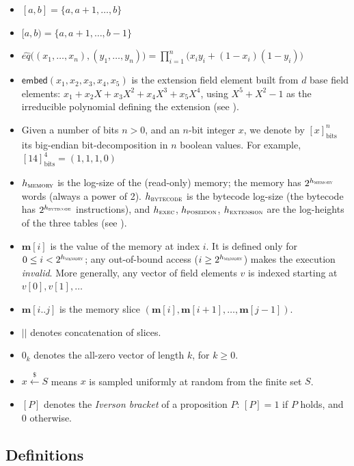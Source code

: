 \documentclass{article}
\theoremstyle{definition}
\newcommand{\extdeg}{d} %
\begin{document}
\begin{itemize}
    \item $[a, b] = \{a, a + 1, \ldots, b\}$
    \item $[a, b) = \{a, a + 1, \ldots, b-1\}$
    \item $\hat{eq}\big((x_1, \dots, x_n), (y_1, \dots, y_n)\big) = \prod_{i = 1}^{n}{\big(x_i y_i + (1 - x_i)(1 - y_i)\big)}$
    \item \label{sec:preliminaries-embed} $\mathsf{embed}(x_1, x_2, x_3, x_4, x_5)$ is the extension field element built from $\extdeg$ base field elements: $x_1 + x_2 X + x_3 X^2 + x_4 X^3 + x_5 X^4$, using $X^5 + X^2 - 1$ as the irreducible polynomial defining the extension (see ).
    \item Given a number of bits $n > 0$, and an $n$-bit integer $x$, we denote by $[x]_\text{bits}^n$ its big-endian bit-decomposition in $n$ boolean values. For example, $[14]_\text{bits}^4 = (1, 1, 1, 0)$
    \item $h_\textsc{memory}$ is the log-size of the (read-only) memory; the memory has $2^{h_\textsc{memory}}$ words (always a power of 2). $h_\textsc{bytecode}$ is the bytecode log-size (the bytecode has $2^{h_\textsc{bytecode}}$ instructions), and $h_\textsc{exec}$, $h_\textsc{poseidon}$, $h_\textsc{extension}$ are the log-heights of the three tables (see ).
    \item $\textbf{m}[i]$ is the value of the memory at index $i$. It is defined only for $0 \leq i < 2^{h_\textsc{memory}}$; any out-of-bound access ($i \geq 2^{h_\textsc{memory}}$) makes the execution \emph{invalid}. More generally, any vector of field elements $v$ is indexed starting at $v[0], v[1], \dots$
    \item $\textbf{m}[i..j]$ is the memory slice $(\textbf{m}[i], \textbf{m}[i+1], \ldots, \textbf{m}[j-1])$.
    \item $||$ denotes concatenation of slices.
    \item $0_k$ denotes the all-zero vector of length $k$, for $k \geq 0$.
    \item $x \overset{\$}{\leftarrow} S$ means $x$ is sampled uniformly at random from the finite set $S$.
    \item $[P]$ denotes the \emph{Iverson bracket} of a proposition $P$: $[P] = 1$ if $P$ holds, and $0$ otherwise.
\end{itemize}

\subsection{Definitions}
\end{document}
